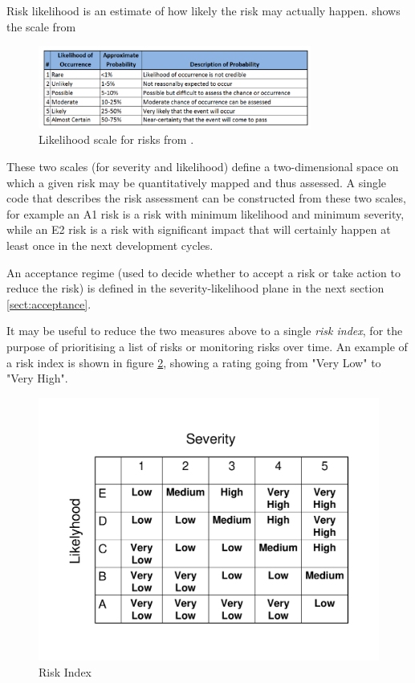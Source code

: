 Risk likelihood is an estimate of how likely the risk may actually happen.  shows the scale from 

\begin{figure}
\begin{center}
\includegraphics[width=0.8\textwidth]{images/lh}
\caption{Likelihood scale for risks from .\label{fig:lh}}
\end{center}

\end{figure}

These two scales (for severity and likelihood) define a two-dimensional space on which a given risk may be quantitatively mapped and thus assessed. A single code that describes the risk assessment can be constructed from these two scales, for example an A1 risk is a risk with minimum likelihood and minimum severity, while an E2 risk is a risk with significant impact that will certainly happen at least once in the next development cycles.

An acceptance regime (used to decide whether to accept a risk or take action to reduce the risk) is defined in the severity-likelihood plane in the next section \ref{sect:acceptance}.

It may be useful to reduce the two measures above to a single \emph{risk index}, for the purpose of prioritising a list of risks or monitoring risks over time. An example of a risk index is shown in figure \ref{fig:riskindex}, showing a rating going from "Very Low" to "Very High".

  \begin{figure}[H]
  \begin{center}
  	\includegraphics[scale=0.5]{images/RiskIndex}
  \end{center}
\vspace{-2cm}
\caption{Risk Index \label{fig:riskindex}}
   \end{figure}

